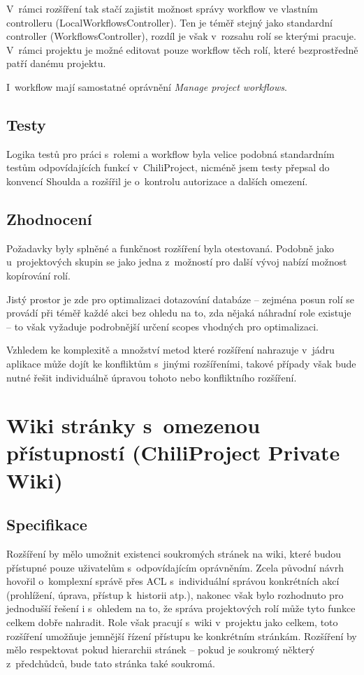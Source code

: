 \documentclass[thesis=B,czech]{FITthesis}[2012/05/02]
\begin{document}
V~rámci rozšíření tak stačí zajistit možnost správy workflow ve vlastním
controlleru (LocalWorkflowsController). Ten je téměř stejný jako
standardní controller (WorkflowsController), rozdíl je však v~rozsahu
rolí se kterými pracuje. V~rámci projektu je možné editovat pouze
workflow těch rolí, které bezprostředně patří danému projektu.

I~workflow mají samostatné oprávnění \emph{Manage project workflows}.

\subsection{Testy}

Logika testů pro práci s~rolemi a workflow byla velice podobná
standardním testům odpovídajících funkcí v~ChiliProject, nicméně jsem
testy přepsal do konvencí Shoulda a rozšířil je o~kontrolu autorizace a
dalších omezení.

\subsection{Zhodnocení}

Požadavky byly splněné a funkčnost rozšíření byla otestovaná. Podobně
jako u~projektových skupin se jako jedna z~možností pro další vývoj
nabízí možnost kopírování rolí.

Jistý prostor je zde pro optimalizaci dotazování databáze -- zejména
posun rolí se provádí při téměř každé akci bez ohledu na to, zda nějaká
náhradní role existuje -- to však vyžaduje podrobnější určení
\glspl{scope} vhodných pro optimalizaci.

Vzhledem ke komplexitě a množství metod které rozšíření nahrazuje
v~jádru aplikace může dojít ke konfliktům s~jinými rozšířeními, takové
případy však bude nutné řešit individuálně úpravou tohoto nebo
konfliktního rozšíření.

\section[Wiki stránky s~omezenou přístupností]{Wiki stránky s~omezenou přístupností (ChiliProject Private
Wiki)}
\label{sec:private_wiki}

\subsection{Specifikace}

Rozšíření by mělo umožnit existenci soukromých stránek na \gls{wiki},
které budou přístupné pouze uživatelům s~odpovídajícím oprávněním. Zcela
původní návrh hovořil o~komplexní správě přes \gls{ACL} s~individuální
správou konkrétních akcí (prohlížení, úprava, přístup k~historii atp.),
nakonec však bylo rozhodnuto pro jednodušší řešení i s~ohledem na to, že
správa projektových rolí může tyto funkce celkem dobře nahradit. Role
však pracují s~wiki v~projektu jako celkem, toto rozšíření umožňuje
jemnější řízení přístupu ke konkrétním stránkám. Rozšíření by mělo
respektovat pokud hierarchii stránek -- pokud je soukromý některý
z~předchůdců, bude tato stránka také soukromá.
\end{document}
